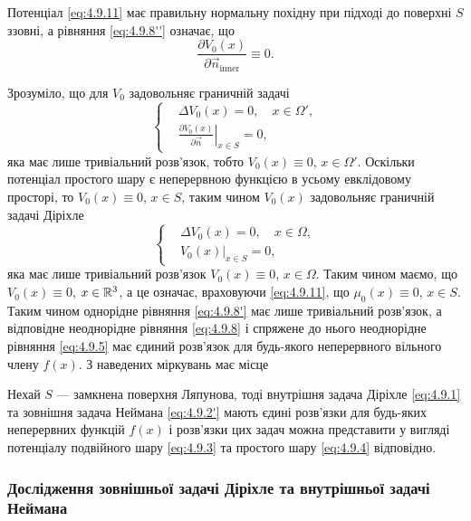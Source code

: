 Потенціал \eqref{eq:4.9.11} має правильну нормальну похідну при підході до поверхні $S$ ззовні, а рівняння \eqref{eq:4.9.8''} означає, що
\begin{equation}
	\label{eq:4.9.12}
	\frac{\partial V_0(x)}{\partial \vec n_{\text{inner}}} \equiv 0.
\end{equation}

Зрозуміло, що для $V_0$ задовольняє граничній задачі
\begin{equation}
	\label{eq:4.9.13}
	\left\{
		\begin{aligned}
			& \Delta V_0(x) = 0, \quad x \in \Omega', \\
			& \left. \frac{\partial V_0(x)}{\partial \vec n} \right|_{x \in S} = 0,
		\end{aligned}
	\right.
\end{equation}
яка має лише тривіальний розв'язок, тобто $V_0(x) \equiv 0$, $x \in \Omega'$. Оскільки потенціал простого шару є неперервною функцією в усьому евклідовому просторі, то $V_0(x) \equiv 0$, $x \in S$, таким чином $V_0(x)$ задовольняє граничній задачі Діріхле
\begin{equation}
	\left\{
		\begin{aligned}
			& \Delta V_0(x) = 0, \quad x \in \Omega, \\
			& \left .V_0(x) \right|_{x \in S} = 0,
		\end{aligned}
	\right.
\end{equation}
яка має лише тривіальний розв'язок $V_0(x) \equiv 0$, $x \in \Omega$. Таким чином маємо, що $V_0(x) \equiv 0$, $x \in \mathbb{R}^3$, а це означає, враховуючи \eqref{eq:4.9.11}, що $\mu_0(x) \equiv 0$, $x \in S$. Таким чином однорідне рівняння \eqref{eq:4.9.8'} має лише тривіальний розв'язок, а відповідне неоднорідне рівняння \eqref{eq:4.9.8} і спряжене до нього неоднорідне рівняння \eqref{eq:4.9.5} має єдиний розв'язок для будь-якого неперервного вільного члену $f(x)$. З наведених міркувань має місце 

\begin{theorem}
	Нехай $S$ --- замкнена поверхня Ляпунова, тоді внутрішня задача Діріхле \eqref{eq:4.9.1} та зовнішня задача Неймана \eqref{eq:4.9.2'} мають єдині розв'язки для будь-яких неперервних функцій $f(x)$ і розв'язки цих задач можна представити у вигляді потенціалу подвійного шару \eqref{eq:4.9.3} та простого шару \eqref{eq:4.9.4} відповідно.
\end{theorem}

\subsubsection{Дослідження зовнішньої задачі Діріхле та внутрішньої задачі Неймана}

